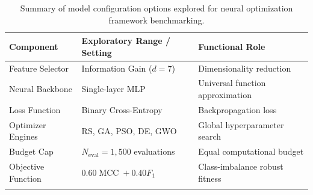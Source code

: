 
\begin{table}[htbp]
\caption{Summary of model configuration options explored for neural optimization framework benchmarking.}
\label{tab:config_options}
\centering
\small
\setlength{\tabcolsep}{4pt}
\begin{tabularx}{\textwidth}{@{}L L L@{}}
\toprule
Component & Exploratory Range / Setting & Functional Role \\
\midrule
Feature Selector & Information Gain ($d=7$) & Dimensionality reduction \\
Neural Backbone & Single-layer MLP & Universal function approximation \\
Loss Function & Binary Cross-Entropy & Backpropagation loss \\
Optimizer Engines & RS, GA, PSO, DE, GWO & Global hyperparameter search \\
Budget Cap & $N_{\text{eval}} = 1,500$ evaluations & Equal computational budget \\
Objective Function & $0.60\operatorname{MCC} + 0.40F_1$ & Class-imbalance robust fitness \\
\botrule
\end{tabularx}
\end{table}
